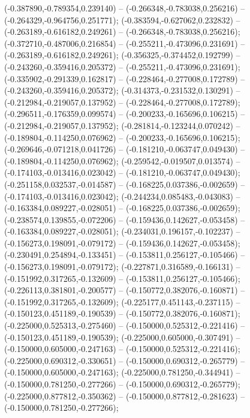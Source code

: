  (-0.387890,-0.789354,0.239140) -- (-0.266348,-0.783038,0.256216) -- (-0.264329,-0.964756,0.251771);
 (-0.383594,-0.627062,0.232832) -- (-0.263189,-0.616182,0.249261) -- (-0.266348,-0.783038,0.256216);
 (-0.372710,-0.487006,0.216854) -- (-0.255211,-0.473096,0.231691) -- (-0.263189,-0.616182,0.249261);
 (-0.356325,-0.374452,0.192799) -- (-0.243260,-0.359416,0.205372) -- (-0.255211,-0.473096,0.231691);
 (-0.335902,-0.291339,0.162817) -- (-0.228464,-0.277008,0.172789) -- (-0.243260,-0.359416,0.205372);
 (-0.314373,-0.231532,0.130291) -- (-0.212984,-0.219057,0.137952) -- (-0.228464,-0.277008,0.172789);
 (-0.296511,-0.176359,0.099574) -- (-0.200233,-0.165696,0.106215) -- (-0.212984,-0.219057,0.137952);
 (-0.281814,-0.123244,0.070242) -- (-0.189804,-0.114250,0.076962) -- (-0.200233,-0.165696,0.106215);
 (-0.269646,-0.071218,0.041726) -- (-0.181210,-0.063747,0.049430) -- (-0.189804,-0.114250,0.076962);
 (-0.259542,-0.019507,0.013574) -- (-0.174103,-0.013416,0.023042) -- (-0.181210,-0.063747,0.049430);
 (-0.251158,0.032537,-0.014587) -- (-0.168225,0.037386,-0.002659) -- (-0.174103,-0.013416,0.023042);
 (-0.244234,0.085483,-0.043083) -- (-0.163384,0.089227,-0.028051) -- (-0.168225,0.037386,-0.002659);
 (-0.238574,0.139855,-0.072206) -- (-0.159436,0.142627,-0.053458) -- (-0.163384,0.089227,-0.028051);
 (-0.234031,0.196157,-0.102237) -- (-0.156273,0.198091,-0.079172) -- (-0.159436,0.142627,-0.053458);
 (-0.230491,0.254894,-0.133451) -- (-0.153811,0.256127,-0.105466) -- (-0.156273,0.198091,-0.079172);
 (-0.227871,0.316589,-0.166131) -- (-0.151992,0.317265,-0.132609) -- (-0.153811,0.256127,-0.105466);
 (-0.226113,0.381801,-0.200577) -- (-0.150772,0.382076,-0.160871) -- (-0.151992,0.317265,-0.132609);
 (-0.225177,0.451143,-0.237115) -- (-0.150123,0.451189,-0.190539) -- (-0.150772,0.382076,-0.160871);
 (-0.225000,0.525313,-0.275460) -- (-0.150000,0.525312,-0.221416) -- (-0.150123,0.451189,-0.190539);
 (-0.225000,0.605000,-0.307491) -- (-0.150000,0.605000,-0.247163) -- (-0.150000,0.525312,-0.221416);
 (-0.225000,0.690312,-0.330651) -- (-0.150000,0.690312,-0.265779) -- (-0.150000,0.605000,-0.247163);
 (-0.225000,0.781250,-0.344941) -- (-0.150000,0.781250,-0.277266) -- (-0.150000,0.690312,-0.265779);
 (-0.225000,0.877812,-0.350362) -- (-0.150000,0.877812,-0.281623) -- (-0.150000,0.781250,-0.277266);
